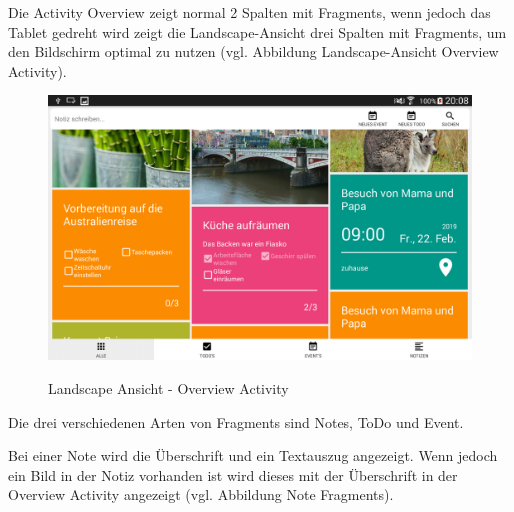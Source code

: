 Die Activity Overview zeigt normal 2 Spalten mit Fragments, wenn jedoch das Tablet gedreht wird zeigt die Landscape-Ansicht drei Spalten mit Fragments, um den Bildschirm optimal zu nutzen (vgl. Abbildung Landscape-Ansicht Overview Activity).

\begin{figure}[H]
\centering
\begin{minipage}[t]{1\textwidth} %
\caption{Landscape Ansicht - Overview Activity} %
\includegraphics[width=1\textwidth]{img/Landscape}\\ %
\end{minipage}
\end{figure}

Die drei verschiedenen Arten von Fragments sind Notes, ToDo und Event.

Bei einer Note wird die Überschrift und ein Textauszug angezeigt. Wenn jedoch ein Bild in der Notiz vorhanden ist wird dieses mit der Überschrift in der Overview Activity angezeigt (vgl. Abbildung Note Fragments).

